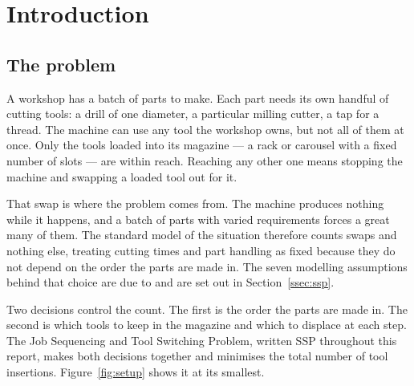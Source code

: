\section{Introduction}\label{sec:intro}

\subsection{The problem}\label{ssec:intro-problem}

A workshop has a batch of parts to make. Each part needs its own handful of cutting
tools: a drill of one diameter, a particular milling cutter, a tap for a thread. The
machine can use any tool the workshop owns, but not all of them at once. Only the tools
loaded into its magazine --- a rack or carousel with a fixed number of slots --- are
within reach. Reaching any other one means stopping the machine and swapping a loaded
tool out for it.

That swap is where the problem comes from. The machine produces nothing while it
happens, and a batch of parts with varied requirements forces a great many of them. The
standard model of the situation therefore counts swaps and nothing else, treating
cutting times and part handling as fixed because they do not depend on the order the
parts are made in. The seven modelling assumptions behind that choice are due to
\citet{Crama1994} and are set out in Section~\ref{ssec:ssp}.

Two decisions control the count. The first is the order the parts are made in. The
second is which tools to keep in the magazine and which to displace at each step. The
Job Sequencing and Tool Switching Problem, written SSP throughout this report, makes
both decisions together and minimises the total number of tool insertions.
Figure~\ref{fig:setup} shows it at its smallest.

